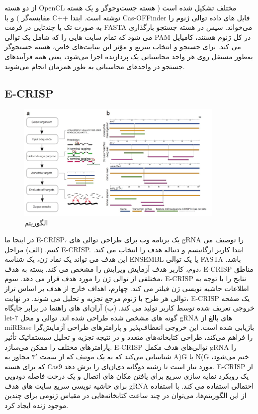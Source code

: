 \documentclass[12pt,a4paper,BCOR=.7cm,headsepline,bibliography=totoc]{report}
\begin{document}
 از دو هسته OpenCL مختلف تشکیل شده است
( هسته جست‌وجوگر و یک هسته مقایسه‌گر ) و با C++ نوشته است. ابتدا Cas-OFFinder فایل های داده توالی ژنوم را به صورت تک یا چندتایی در فرمت FASTA می‌خواند. سپس در هسته جستجو بارگذاری می شود که تمام سایت هایی را که شامل یک توالی PAM در کل ژنوم هستند، کامپایل می کند. برای جستجو و انتخاب سریع و مؤثر این سایت‌های خاص، هسته جستجوگر به‌طور مستقل روی هر واحد محاسباتی یک پردازنده اجرا می‌شود، یعنی همه فرآیندهای جستجو در واحدهای محاسباتی به طور همزمان انجام می‌شوند.


\subsection{E-CRISP ~\cite{E-CRISP}}
\begin{figure}
\centering
\includegraphics[width=10cm, ]{pictures/ecrispr.jpg}
\caption{
الگوریتم  \cite{E-CRISP}
}\label{wrap-fig:4}
\end{figure}

در اینجا ما E-CRISP، یک برنامه وب برای طراحی توالی های gRNA را توصیف می کنیم. (الف) مراحل E-CRISP. ابتدا کاربر ارگانیسم و دنباله هدف را انتخاب می کند. این هدف می تواند یک نماد ژن، یک شناسه ENSEMBL یا یک توالی FASTA باشد. دوم، کاربر هدف آزمایش ویرایش را مشخص می کند. بسته به هدف، E-CRISP مناطق مختلفی از توالی ژن را مورد هدف قرار می دهد.
سوم، E-CRISP نتایج را با توجه به اطلاعات حاشیه نویسی ژن فیلتر می کند. چهارم، اهداف خارج از هدف بر اساس تراز توالی هر طرح با ژنوم مرجع تجزیه و تحلیل می شوند. در نهایت، E-CRISP یک صفحه خروجی تعریف شده توسط کاربر تولید می کند.
(ب) آر‌ان‌ای های راهنما در برابر جایگاه let-7 گونه های مشخص شده طراحی شده اند. توالی و محل gRNA های بالغ از miRBase بازیابی شده است. این خروجی انعطاف‌پذیر و پارامترهای طراحی آزمایش‌گرا را فراهم می‌کند، طراحی کتابخانه‌های متعدد و در نتیجه تجزیه و تحلیل سیستماتیک تأثیر پارامترهای مختلف را ممکن می‌سازد. E-CRISP توالی‌های هدف مکمل gRNA را شناسایی می‌کند که به یک موتیف که از سمت  '۳ مجاور به A)G یا N(G ختم می‌شود، که برای هسته Cas9 مورد نیاز است تا رشته دوگانه دی‌ان‌ای را برش دهد. E-CRISP از یک رویکرد نمایه سازی سریع برای یافتن مکان های اتصال و یک درخت فاصله دودویی برای حاشیه نویسی سریع سایت های هدف gRNA احتمالی استفاده می کند. با استفاده از این الگوریتم‌ها، می‌توان در چند ساعت کتابخانه‌هایی در مقیاس ژنومی برای چندین موجود زنده ایجاد کرد.
\end{document}
